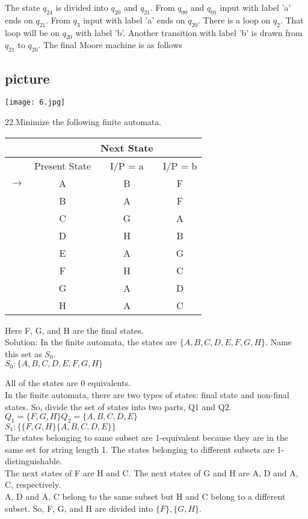\documentclass[9pt]{beamer}
\begin{document}
\begin{frame}
The state $q_24$ is divided into $q_20$ and $q_21$. From $q_00$ and $q_01$ input with label 'a' ends on $q_21$. From $q_3$ input with label 'a' ends on $q_20$. There is a loop on $q_2$. That loop will be on $q_20$ with label 'b'. Another transition with label 'b' is drawn from $q_21$ to $q_20$. The final Moore machine is as follows\\
\begin{center}
\section{picture}
\texttt{[image: 6.jpg]}
\end{center}
\end{frame}

\begin{frame}
22.Minimize the following finite automata.\\
\begin{center}
\begin{tabular}{rccc}
	\hline
	&&Next State\\
	\hline
	&Present State&I/P = a&I/P = b\\
	\hline
	$\rightarrow$&A&B&F\\
	&B&A&F\\
	&C&G&A\\
	&D&H&B\\
	&E&A&G\\
	&F&H&C\\
	&G&A&D\\
	&H&A&C\\
	\hline
\end{tabular}
\end{center}
Here F, G, and H are the final states.\\
Solution: In the finite automata, the states are $\{A, B, C, D, E, F, G, H\}$. Name this set as $S_0$.\\
$S_0: \{A, B, C, D, E, F, G, H\}$\\
\end{frame}
\begin{frame}
All of the states are 0 equivalents.\\
In the finite automata, there are two types of states: final state and non-final states. So, divide the set of states into two parts, Q1 and Q2.\\
$Q_1 = \{F, G, H\} Q_2 = \{A, B, C, D, E\}$\\
$S_1: \{\{F, G, H\} \{A, B, C, D, E\}\}$\\
The states belonging to same subset are 1-equivalent because they are in the same set for string length 1. The states belonging to different subsets are 1-distinguishable.\\
The next states of F are H and C. The next states of G and H are A, D and A, C, respectively.\\
A, D and A, C belong to the same subset but H and C belong to a different subset. So, F, G, and H are divided into $\{F\}, \{G, H\}$.\\
\end{frame}
\end{document}
